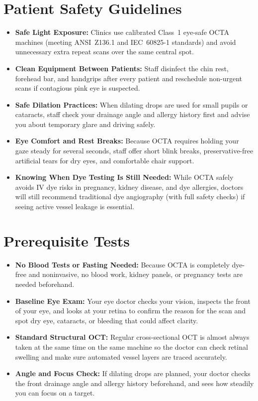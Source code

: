 \section{Patient Safety Guidelines}
\begin{itemize}
\item \textbf{Safe Light Exposure:} Clinics use calibrated Class~1 eye-safe OCTA machines (meeting ANSI~Z136.1 and IEC~60825-1 standards) and avoid unnecessary extra repeat scans over the same central spot.
\item \textbf{Clean Equipment Between Patients:} Staff disinfect the chin rest, forehead bar, and handgrips after every patient and reschedule non-urgent scans if contagious pink eye is suspected.
\item \textbf{Safe Dilation Practices:} When dilating drops are used for small pupils or cataracts, staff check your drainage angle and allergy history first and advise you about temporary glare and driving safely.
\item \textbf{Eye Comfort and Rest Breaks:} Because OCTA requires holding your gaze steady for several seconds, staff offer short blink breaks, preservative-free artificial tears for dry eyes, and comfortable chair support.
\item \textbf{Knowing When Dye Testing Is Still Needed:} While OCTA safely avoids IV dye risks in pregnancy, kidney disease, and dye allergies, doctors will still recommend traditional dye angiography (with full safety checks) if seeing active vessel leakage is essential.
\end{itemize}

\section{Prerequisite Tests}
\begin{itemize}
\item \textbf{No Blood Tests or Fasting Needed:} Because OCTA is completely dye-free and noninvasive, no blood work, kidney panels, or pregnancy tests are needed beforehand.
\item \textbf{Baseline Eye Exam:} Your eye doctor checks your vision, inspects the front of your eye, and looks at your retina to confirm the reason for the scan and spot dry eye, cataracts, or bleeding that could affect clarity.
\item \textbf{Standard Structural OCT:} Regular cross-sectional OCT is almost always taken at the same time on the same machine so the doctor can check retinal swelling and make sure automated vessel layers are traced accurately.
\item \textbf{Angle and Focus Check:} If dilating drops are planned, your doctor checks the front drainage angle and allergy history beforehand, and sees how steadily you can focus on a target.
\end{itemize}


